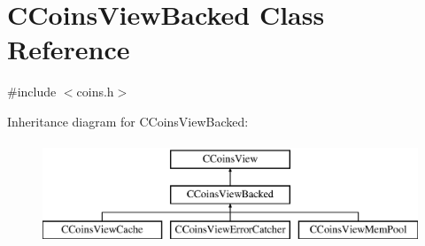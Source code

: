 \hypertarget{class_c_coins_view_backed}{}\section{C\+Coins\+View\+Backed Class Reference}
\label{class_c_coins_view_backed}


{\ttfamily \#include $<$coins.\+h$>$}

Inheritance diagram for C\+Coins\+View\+Backed\+:\begin{figure}[H]
\begin{center}
\leavevmode
\includegraphics[height=3.000000cm]{class_c_coins_view_backed}
\end{center}
\end{figure}
